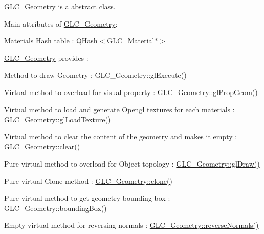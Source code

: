 \hyperlink{class_g_l_c___geometry}{G\-L\-C\-\_\-\-Geometry} is a abstract class. \par
 \par
 Main attributes of \hyperlink{class_g_l_c___geometry}{G\-L\-C\-\_\-\-Geometry}\-:
\begin{DoxyItemize}
\item Materials Hash table \-: Q\-Hash$<$\-G\-L\-C\-\_\-\-Material$\ast$$>$
\end{DoxyItemize}

\hyperlink{class_g_l_c___geometry}{G\-L\-C\-\_\-\-Geometry} provides \-:
\begin{DoxyItemize}
\item Method to draw Geometry \-: G\-L\-C\-\_\-\-Geometry\-::gl\-Execute()
\item Virtual method to overload for visual property \-: \hyperlink{class_g_l_c___geometry_a5766e264e601a59272b662d8f5411a82}{G\-L\-C\-\_\-\-Geometry\-::gl\-Prop\-Geom()}
\item Virtual method to load and generate Opengl textures for each materials \-: \hyperlink{class_g_l_c___geometry_a4232405e145f383f46f84f04bf752133}{G\-L\-C\-\_\-\-Geometry\-::gl\-Load\-Texture()}
\item Virtual method to clear the content of the geometry and makes it empty \-: \hyperlink{class_g_l_c___geometry_a6d5ea8d6790556a535db1530bbed31e6}{G\-L\-C\-\_\-\-Geometry\-::clear()}
\end{DoxyItemize}


\begin{DoxyItemize}
\item Pure virtual method to overload for Object topology \-: \hyperlink{class_g_l_c___geometry_a77780d296ce0bd4e392d219a43782eda}{G\-L\-C\-\_\-\-Geometry\-::gl\-Draw()}
\item Pure virtual Clone method \-: \hyperlink{class_g_l_c___geometry_adb1db203e8a151666595c93d7a72bce6}{G\-L\-C\-\_\-\-Geometry\-::clone()}
\item Pure virtual method to get geometry bounding box \-: \hyperlink{class_g_l_c___geometry_a84c5dd9cfe6e42fed117f849e9963790}{G\-L\-C\-\_\-\-Geometry\-::bounding\-Box()}
\end{DoxyItemize}


\begin{DoxyItemize}
\item Empty virtual method for reversing normals \-: \hyperlink{class_g_l_c___geometry_a56656f1e8a767a4d5ce61291e98636a9}{G\-L\-C\-\_\-\-Geometry\-::reverse\-Normals()}
\end{DoxyItemize}


